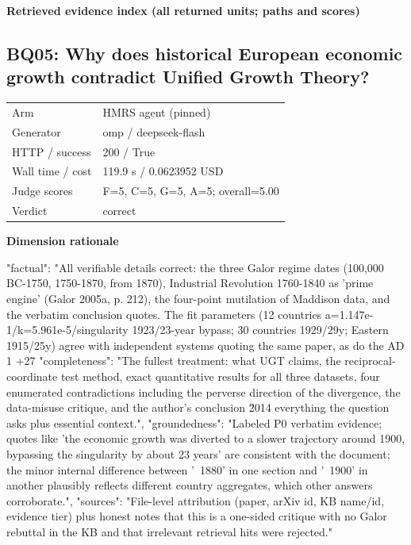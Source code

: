 \documentclass[10pt]{article}
\begin{document}
\textbf{Retrieved evidence index (all returned units; paths and scores) }
\begin{EvidenceText}
\end{EvidenceText}
\subsection{BQ05: Why does historical European economic growth contradict Unified Growth Theory?}
\begin{tabular}{@{}ll@{}}
Arm & HMRS agent (pinned)\\
Generator & omp / deepseek-flash\\
HTTP / success & 200 / True\\
Wall time / cost & 119.9 s / 0.0623952 USD\\
Judge scores & F=5, C=5, G=5, A=5; overall=5.00\\
Verdict & correct\\
\end{tabular}

\textbf{Dimension rationale}
\begin{EvidenceText}
{
  "factual": "All verifiable details correct: the three Galor regime dates (100,000 BC-1750, 1750-1870, from 1870), Industrial Revolution 1760-1840 as 'prime engine' (Galor 2005a, p. 212), the four-point mutilation of Maddison data, and the verbatim conclusion quotes. The fit parameters (12 countries a=1.147e-1/k=5.961e-5/singularity 1923/23-year bypass; 30 countries 1929/29y; Eastern 1915/25y) agree with independent systems quoting the same paper, as do the AD 1 +27%
  "completeness": "The fullest treatment: what UGT claims, the reciprocal-coordinate test method, exact quantitative results for all three datasets, four enumerated contradictions including the perverse direction of the divergence, the data-misuse critique, and the author's conclusion \u2014 everything the question asks plus essential context.",
  "groundedness": "Labeled P0 verbatim evidence; quotes like 'the economic growth was diverted to a slower trajectory around 1900, bypassing the singularity by about 23 years' are consistent with the document; the minor internal difference between '~1880' in one section and '~1900' in another plausibly reflects different country aggregates, which other answers corroborate.",
  "sources": "File-level attribution (paper, arXiv id, KB name/id, evidence tier) plus honest notes that this is a one-sided critique with no Galor rebuttal in the KB and that irrelevant retrieval hits were rejected."
}
\end{EvidenceText}
\end{document}
